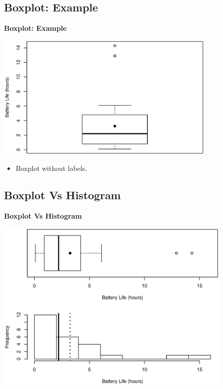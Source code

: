 \documentclass[compress]{beamer}        %
\makeatletter
\newcommand{\tcb}{\textcolor{beamer@blendedblue}}
\makeatother
\begin{document}
\subsection{Boxplot: Example}
\begin{frame}{\bf \tcb{Boxplot: Example}\\[-1.1cm]}
\begin{center}
\includegraphics[width=0.8\textwidth, trim = 0.0cm 0.5cm 0.3cm 1cm, clip]{Boxplot}
\end{center}
\begin{itemize}\itemsep0.2cm
\item Boxplot without labels.
\end{itemize}

\end{frame}


\subsection{Boxplot Vs Histogram}
\begin{frame}{\bf \tcb{Boxplot Vs Histogram}\\[-1.1cm]}
\begin{center}
\includegraphics[width=0.86\textwidth, trim = 0.2cm 0.0cm 1cm 0.0cm, clip]{BoxplotHist}
\end{center}
\end{frame}
\end{document}

